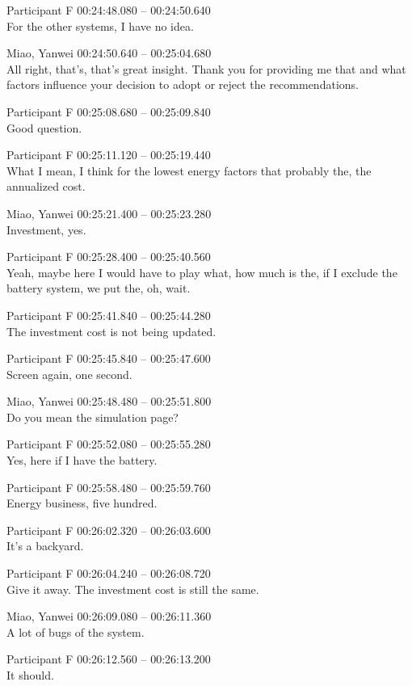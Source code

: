 {Participant F 00:24:48.080 -- 00:24:50.640 \\
For the other systems, I have no idea.

Miao, Yanwei 00:24:50.640 -- 00:25:04.680 \\
All right, that's, that's great insight. Thank you for providing me that and what factors influence your decision to adopt or reject the recommendations.

Participant F 00:25:08.680 -- 00:25:09.840 \\
Good question.

Participant F 00:25:11.120 -- 00:25:19.440 \\
What I mean, I think for the lowest energy factors that probably the, the annualized cost.

Miao, Yanwei 00:25:21.400 -- 00:25:23.280 \\
Investment, yes.

Participant F 00:25:28.400 -- 00:25:40.560 \\
Yeah, maybe here I would have to play what, how much is the, if I exclude the battery system, we put the, oh, wait.

Participant F 00:25:41.840 -- 00:25:44.280 \\
The investment cost is not being updated.

Participant F 00:25:45.840 -- 00:25:47.600 \\
Screen again, one second.

Miao, Yanwei 00:25:48.480 -- 00:25:51.800 \\
Do you mean the simulation page?

Participant F 00:25:52.080 -- 00:25:55.280 \\
Yes, here if I have the battery.

Participant F 00:25:58.480 -- 00:25:59.760 \\
Energy business, five hundred.

Participant F 00:26:02.320 -- 00:26:03.600 \\
It's a backyard.

Participant F 00:26:04.240 -- 00:26:08.720 \\
Give it away. The investment cost is still the same.

Miao, Yanwei 00:26:09.080 -- 00:26:11.360 \\
A lot of bugs of the system.

Participant F 00:26:12.560 -- 00:26:13.200 \\
It should.

}
